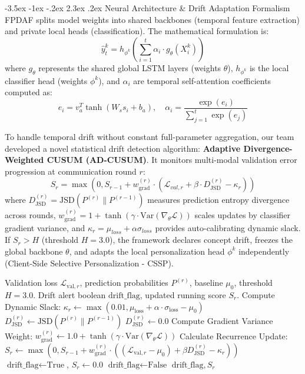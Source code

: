 \documentclass[11pt, a4paper]{article}
\makeatletter
\renewcommand\section{\@startsection {section}{1}{\z@}%
                                   {-3.5ex \@plus -1ex \@minus -.2ex}%
                                   {2.3ex \@plus.2ex}%
                                   {\normalfont\large\bfseries\color{amritaMaroon}}}
\makeatother
\begin{document}
\section{Neural Architecture \& Drift Adaptation Formalism}
FPDAF splits model weights into shared backbones (temporal feature extraction) and private local heads (classification). The mathematical formulation is:
\[ \hat{y}_t^k = h_{\phi^k} \left( \sum_{i=1}^{t} \alpha_i \cdot g_{\theta}(X_{i}^k) \right) \]
where $g_{\theta}$ represents the shared global LSTM layers (weights $\theta$), $h_{\phi^k}$ is the local classifier head (weights $\phi^k$), and $\alpha_i$ are temporal self-attention coefficients computed as:
\[ e_i = v_a^T \tanh(W_s s_i + b_a), \quad \alpha_i = \frac{\exp(e_i)}{\sum_{j=1}^{t} \exp(e_j)} \]

To handle temporal drift without constant full-parameter aggregation, our team developed a novel statistical drift detection algorithm: \textbf{Adaptive Divergence-Weighted CUSUM (AD-CUSUM)}. It monitors multi-modal validation error progression at communication round $r$:
\[ S_r = \max\left(0, S_{r-1} + w_{\text{grad}}^{(r)} \cdot \left(\mathcal{L}_{val, r} + \beta \cdot D_{\text{JSD}}^{(r)} - \kappa_r\right)\right) \]
where $D_{\text{JSD}}^{(r)} = \text{JSD}(P^{(r)} \parallel P^{(r-1)})$ measures prediction entropy divergence across rounds, $w_{\text{grad}}^{(r)} = 1 + \tanh(\gamma \cdot \text{Var}(\nabla_{\theta} \mathcal{L}))$ scales updates by classifier gradient variance, and $\kappa_r = \mu_{loss} + \alpha \sigma_{loss}$ provides auto-calibrating dynamic slack. If $S_r > H$ (threshold $H = 3.0$), the framework declares concept drift, freezes the global backbone $\theta$, and adapts the local personalization head $\phi^k$ independently (Client-Side Selective Personalization - CSSP).

\begin{algorithm}[H]
\caption{Developed AD-CUSUM Drift Detection Algorithm (Project Innovation)}
\label{alg:ad_cusum_report}
\begin{algorithmic}[1]
\REQUIRE Validation loss $\mathcal{L}_{\text{val}, r}$, prediction probabilities $P^{(r)}$, baseline $\mu_0$, threshold $H = 3.0$.
\ENSURE Drift alert boolean $\text{drift\_flag}$, updated running score $S_r$.
\STATE Compute Dynamic Slack: $\kappa_r \leftarrow \max(0.01, \mu_{\text{loss}} + \alpha \cdot \sigma_{\text{loss}} - \mu_0)$
    \STATE $D_{\text{JSD}}^{(r)} \leftarrow \text{JSD}\left(P^{(r)} \parallel P^{(r-1)}\right)$
\ELSE
    \STATE $D_{\text{JSD}}^{(r)} \leftarrow 0.0$
\ENDIF
\STATE Compute Gradient Variance Weight: $w_{\text{grad}}^{(r)} \leftarrow 1.0 + \tanh\left(\gamma \cdot \text{Var}(\nabla_\theta \mathcal{L})\right)$
\STATE Calculate Recurrence Update: $S_r \leftarrow \max\left(0, S_{r-1} + w_{\text{grad}}^{(r)} \cdot \left((\mathcal{L}_{\text{val}, r} - \mu_0) + \beta D_{\text{JSD}}^{(r)} - \kappa_r\right)\right)$
    \STATE $\text{drift\_flag} \leftarrow \text{True}$, $S_r \leftarrow 0.0$ 
\ELSE
    \STATE $\text{drift\_flag} \leftarrow \text{False}$
\ENDIF
\RETURN $\text{drift\_flag}, S_r$
\end{algorithmic}
\end{algorithm}
\end{document}
